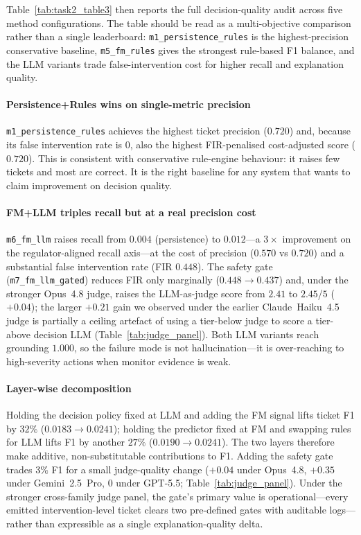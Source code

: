 Table~\ref{tab:task2_table3} then reports the full decision-quality audit across five method configurations. The table should be read as a multi-objective comparison rather than a single leaderboard: \texttt{m1\_persistence\_rules} is the highest-precision conservative baseline, \texttt{m5\_fm\_rules} gives the strongest rule-based F1 balance, and the LLM variants trade false-intervention cost for higher recall and explanation quality.



\paragraph{Persistence+Rules wins on single-metric precision} \texttt{m1\_persistence\_rules} achieves the highest ticket precision ($0.720$) and, because its false intervention rate is $0$, also the highest FIR-penalised cost-adjusted score ($0.720$). This is consistent with conservative rule-engine behaviour: it raises few tickets and most are correct. It is the right baseline for any system that wants to claim improvement on decision quality.

\paragraph{FM+LLM triples recall but at a real precision cost} \texttt{m6\_fm\_llm} raises recall from $0.004$ (persistence) to $0.012$---a $3\times$ improvement on the regulator-aligned recall axis---at the cost of precision ($0.570$ vs $0.720$) and a substantial false intervention rate (FIR $0.448$). The safety gate (\texttt{m7\_fm\_llm\_gated}) reduces FIR only marginally ($0.448 \to 0.437$) and, under the stronger Opus~4.8 judge, raises the LLM-as-judge score from $2.41$ to $2.45$/$5$ ($+0.04$); the larger $+0.21$ gain we observed under the earlier Claude~Haiku~4.5 judge is partially a ceiling artefact of using a tier-below judge to score a tier-above decision LLM (Table~\ref{tab:judge_panel}). Both LLM variants reach grounding $1.000$, so the failure mode is not hallucination---it is over-reaching to high-severity actions when monitor evidence is weak.

\paragraph{Layer-wise decomposition} Holding the decision policy fixed at LLM and adding the FM signal lifts ticket F1 by $32\%$ ($0.0183 \to 0.0241$); holding the predictor fixed at FM and swapping rules for LLM lifts F1 by another $27\%$ ($0.0190 \to 0.0241$). The two layers therefore make additive, non-substitutable contributions to F1. Adding the safety gate trades $3\%$ F1 for a small judge-quality change ($+0.04$ under Opus~4.8, $+0.35$ under Gemini~2.5~Pro, $0$ under GPT-5.5; Table~\ref{tab:judge_panel}). Under the stronger cross-family judge panel, the gate's primary value is operational---every emitted intervention-level ticket clears two pre-defined gates with auditable logs---rather than expressible as a single explanation-quality delta.

